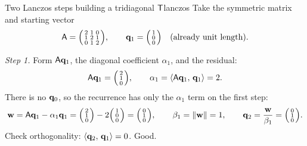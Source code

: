 \begin{workedexample}{Two Lanczos steps building a tridiagonal $\mathsf{T}$}{lanczos}
Take the symmetric matrix and starting vector
\[
  \mathsf{A} = \begin{psmallmatrix} 2 & 1 & 0 \\ 1 & 2 & 1 \\ 0 & 1 & 2 \end{psmallmatrix},
  \qquad
  \mathbf{q}_1 = \begin{psmallmatrix} 1 \\ 0 \\ 0 \end{psmallmatrix}
  \quad(\text{already unit length}).
\]

\emph{Step 1.} Form $\mathsf{A}\mathbf{q}_1$, the diagonal coefficient $\alpha_1$, and the
residual:
\[
  \mathsf{A}\mathbf{q}_1 = \begin{psmallmatrix} 2 \\ 1 \\ 0 \end{psmallmatrix},
  \qquad
  \alpha_1 = \left\langle \mathsf{A}\mathbf{q}_1,\, \mathbf{q}_1\right\rangle = 2 .
\]
There is no $\mathbf{q}_0$, so the recurrence has only the $\alpha_1$ term on the first step:
\[
  \mathbf{w} = \mathsf{A}\mathbf{q}_1 - \alpha_1\mathbf{q}_1
      = \begin{psmallmatrix} 2 \\ 1 \\ 0 \end{psmallmatrix}
      - 2\begin{psmallmatrix} 1 \\ 0 \\ 0 \end{psmallmatrix}
      = \begin{psmallmatrix} 0 \\ 1 \\ 0 \end{psmallmatrix},
  \qquad
  \beta_1 = \lVert\mathbf{w}\rVert = 1,
  \qquad
  \mathbf{q}_2 = \frac{\mathbf{w}}{\beta_1} = \begin{psmallmatrix} 0 \\ 1 \\ 0 \end{psmallmatrix}.
\]
Check orthogonality: $\left\langle \mathbf{q}_2,\, \mathbf{q}_1\right\rangle = 0$. Good.


\end{workedexample}
